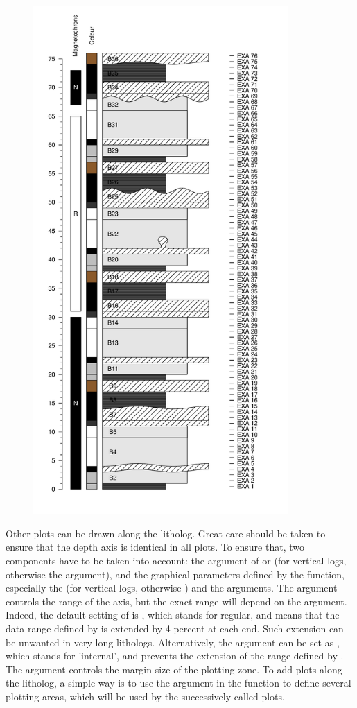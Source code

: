 \begin{figure}[H]
	\centering
	\includegraphics[width=97mm]{advanced.log}
\end{figure}

Other plots can be drawn along the litholog. Great care should be taken to ensure that the depth axis is identical in all plots. To ensure that, two components have to be taken into account: the  argument of  or  (for vertical logs, otherwise the  argument), and the graphical parameters defined by the  function, especially the  (for vertical logs, otherwise ) and the  arguments. The  argument controls the range of the axis, but the exact range will depend on the  argument. Indeed, the default setting of  is , which stands for regular, and means that the data range defined by  is extended by 4 percent at each end. Such extension can be unwanted in very long lithologs. Alternatively, the  argument can be set as , which stands for 'internal', and prevents the extension of the range defined by . The  argument controls the margin size of the plotting zone. To add plots along the litholog, a simple way is to use the  argument in the  function to define several plotting areas, which will be used by the successively called plots.

